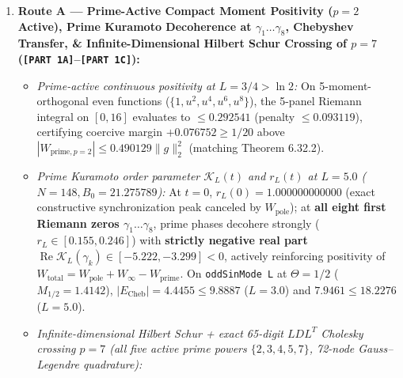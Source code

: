 \documentclass[
  11pt,
]{article}
\providecommand{\tightlist}{%
  \setlength{\itemsep}{0pt}\setlength{\parskip}{0pt}}
\begin{document}
\begin{enumerate}
\def\labelenumi{\arabic{enumi}.}
\tightlist
\item
  \textbf{Route A --- Prime-Active Compact Moment Positivity (\(p = 2\)
  Active), Prime Kuramoto Decoherence at \(\gamma_1 \dots \gamma_8\),
  Chebyshev Transfer, \& Infinite-Dimensional Hilbert Schur Crossing of
  \(p = 7\) (\texttt{{[}PART\ 1A{]}}--\texttt{{[}PART\ 1C{]}}):}

  \begin{itemize}
  \tightlist
  \item
    \emph{Prime-active continuous positivity at \(L = 3/4 > \ln 2\):} On
    5-moment-orthogonal even functions (\(\{1, u^2, u^4, u^6, u^8\}\)),
    the 5-panel Riemann integral on \([0, 16]\) evaluates to
    \(\le 0.292541\) (penalty \(\le 0.093119\)), certifying coercive
    margin \(+0.076752 \ge 1/20\) above
    \(|W_{\text{prime}, p=2}| \le 0.490129\|g\|_2^2\) (matching Theorem
    6.32.2).
  \item
    \emph{Prime Kuramoto order parameter \(\mathcal{K}_L(t)\) and
    \(r_L(t)\) at \(L = 5.0\) (\(N = 148, B_0 = 21.275789\)):} At
    \(t = 0\), \(r_L(0) = 1.000000000000\) (exact constructive
    synchronization peak canceled by \(W_{\text{pole}}\)); at
    \textbf{all eight first Riemann zeros \(\gamma_1 \dots \gamma_8\)},
    prime phases decohere strongly (\(r_L \in [0.155, 0.246]\)) with
    \textbf{strictly negative real part}
    \(\operatorname{Re}\mathcal{K}_L(\gamma_k) \in [-5.222, -3.299] < 0\),
    actively reinforcing positivity of
    \(W_{\text{total}} = W_{\text{pole}} + W_\infty - W_{\text{prime}}\).
    On \texttt{oddSinMode\ L} at \(\Theta = 1/2\)
    (\(M_{1/2} = 1.4142\)), \(|E_{\text{Cheb}}| = 4.4455 \le 9.8887\)
    (\(L = 3.0\)) and \(7.9461 \le 18.2276\) (\(L = 5.0\)).
  \item
    \emph{Infinite-dimensional Hilbert Schur + exact 65-digit \(LDL^T\)
    Cholesky crossing \(p = 7\) (all five active prime powers
    \(\{2, 3, 4, 5, 7\}\), 72-node Gauss--Legendre quadrature):}
  \end{itemize}


\end{enumerate}
\end{document}
